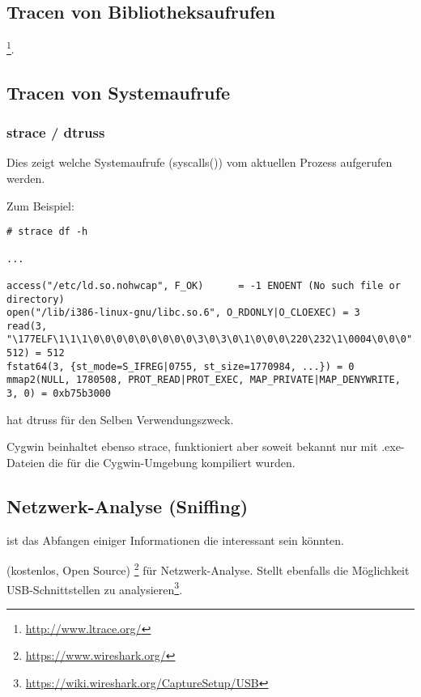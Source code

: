 \subsection{Tracen von Bibliotheksaufrufen}

\footnote{\url{http://www.ltrace.org/}}.

\subsection{Tracen von Systemaufrufe}

\label{strace}
\subsubsection{strace / dtruss}

Dies zeigt welche Systemaufrufe (syscalls()) vom aktuellen Prozess aufgerufen werden.

Zum Beispiel:

\begin{lstlisting}
# strace df -h

...

access("/etc/ld.so.nohwcap", F_OK)      = -1 ENOENT (No such file or directory)
open("/lib/i386-linux-gnu/libc.so.6", O_RDONLY|O_CLOEXEC) = 3
read(3, "\177ELF\1\1\1\0\0\0\0\0\0\0\0\0\3\0\3\0\1\0\0\0\220\232\1\0004\0\0\0"..., 512) = 512
fstat64(3, {st_mode=S_IFREG|0755, st_size=1770984, ...}) = 0
mmap2(NULL, 1780508, PROT_READ|PROT_EXEC, MAP_PRIVATE|MAP_DENYWRITE, 3, 0) = 0xb75b3000
\end{lstlisting}

\myindex{\MacOSX}
\MacOSX hat dtruss für den Selben Verwendungszweck.

Cygwin beinhaltet ebenso strace, funktioniert aber soweit bekannt nur mit .exe-Dateien
die für die Cygwin-Umgebung kompiliert wurden.

\subsection{Netzwerk-Analyse (Sniffing)}

 ist das Abfangen einiger Informationen die interessant sein könnten.

(kostenlos, Open Source) \footnote{\url{https://www.wireshark.org/}} für Netzwerk-Analyse.
Stellt ebenfalls die Möglichkeit USB-Schnittstellen zu analysieren\footnote{\url{https://wiki.wireshark.org/CaptureSetup/USB}}.

